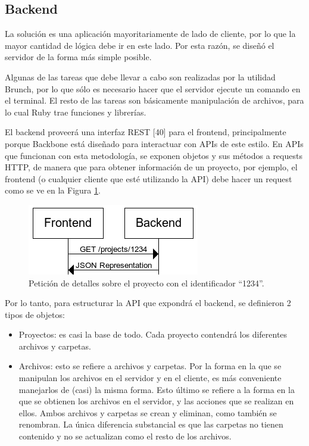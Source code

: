 \documentclass[12pt,spanish,letter]{report}
\makeatletter
\def\maxwidth{\ifdim\Gin@nat@width>\linewidth\linewidth
\else\Gin@nat@width\fi}
\let\Oldincludegraphics\includegraphics
\renewcommand{\includegraphics}[1]{\Oldincludegraphics[width=\maxwidth]{#1}}
\makeatother
\begin{document}
\label{section:solution-design}

\subsection{Backend}

La solución es una aplicación mayoritariamente de lado de cliente, por
lo que la mayor cantidad de lógica debe ir en este lado. Por esta razón,
se diseñó el servidor de la forma más simple posible.

Algunas de las tareas que debe llevar a cabo son realizadas por la
utilidad Brunch, por lo que sólo es necesario hacer que el servidor
ejecute un comando en el terminal. El resto de las tareas son
básicamente manipulación de archivos, para lo cual Ruby trae funciones y
librerías.

El backend proveerá una interfaz REST {[}40{]} para el frontend,
principalmente porque Backbone está diseñado para interactuar con APIs
de este estilo. En APIs que funcionan con esta metodología, se exponen
objetos y sus métodos a requests HTTP, de manera que para obtener
información de un proyecto, por ejemplo, el frontend (o cualquier
cliente que esté utilizando la API) debe hacer un request como se ve en
la Figura \ref{figures:rest}.

\begin{figure}[htbp]
\centering
\includegraphics{figures/rest.png}
\caption{Petición de detalles sobre el proyecto con el identificador
``1234''. \label{figures:rest}}
\end{figure}

Por lo tanto, para estructurar la API que expondrá el backend, se
definieron 2 tipos de objetos:

\begin{itemize}
\item
  Proyectos: es casi la base de todo. Cada proyecto contendrá los
  diferentes archivos y carpetas.
\item
  Archivos: esto se refiere a archivos y carpetas. Por la forma en la
  que se manipulan los archivos en el servidor y en el cliente, es más
  conveniente manejarlos de (casi) la misma forma. Esto último se
  refiere a la forma en la que se obtienen los archivos en el servidor,
  y las acciones que se realizan en ellos. Ambos archivos y carpetas se
  crean y eliminan, como también se renombran. La única diferencia
  substancial es que las carpetas no tienen contenido y no se actualizan
  como el resto de los archivos.
\end{itemize}
\end{document}

